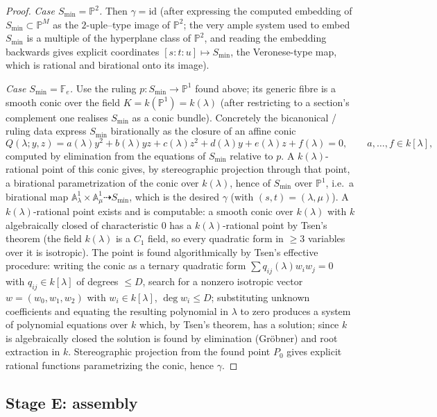 \documentclass{amsart}
\theoremstyle{plain}
\theoremstyle{definition}
\newcommand{\PP}{\mathbb{P}}
\newcommand{\AA}{\mathbb{A}}
\begin{document}
\begin{proof}
\emph{Case $S_{\min}=\PP^2$.}  Then $\gamma=\mathrm{id}$ (after expressing the
computed embedding of $S_{\min}\subset\PP^M$ as the $2$-uple--type image of
$\PP^2$; the very ample system used to embed $S_{\min}$ is a multiple of the
hyperplane class of $\PP^2$, and reading the embedding backwards gives explicit
coordinates $[s:t:u]\mapsto S_{\min}$, the Veronese-type map, which is rational
and birational onto its image).

\emph{Case $S_{\min}=\mathbb F_e$.}  Use the ruling $p\colon S_{\min}\to\PP^1$
found above; its generic fibre is a smooth conic over the field
$K=k(\PP^1)=k(\lambda)$ (after restricting to a section's complement one
realises $S_{\min}$ as a conic bundle).  Concretely the bicanonical / ruling
data express $S_{\min}$ birationally as the closure of an affine conic
\[
Q(\lambda;y,z)=a(\lambda)y^2+b(\lambda)yz+c(\lambda)z^2+d(\lambda)y+e(\lambda)z+f(\lambda)=0,
\qquad a,\dots,f\in k[\lambda],
\]
computed by elimination from the equations of $S_{\min}$ relative to $p$.  A
$k(\lambda)$-rational point of this conic gives, by stereographic projection
through that point, a birational parametrization of the conic over $k(\lambda)$,
hence of $S_{\min}$ over $\PP^1$, i.e.\ a birational map
$\AA^1_{\lambda}\times\AA^1_{\mu}\dashrightarrow S_{\min}$, which is the desired
$\gamma$ (with $(s,t)=(\lambda,\mu)$).  A $k(\lambda)$-rational point exists and
is computable: a smooth conic over $k(\lambda)$ with $k$ algebraically closed of
characteristic $0$ has a $k(\lambda)$-rational point by Tsen's theorem (the field
$k(\lambda)$ is a $C_1$ field, so every quadratic form in $\ge3$ variables over
it is isotropic).  The point is found algorithmically by Tsen's effective
procedure: writing the conic as a ternary quadratic form
$\sum q_{ij}(\lambda)w_iw_j=0$ with $q_{ij}\in k[\lambda]$ of degrees $\le D$,
search for a nonzero isotropic vector $w=(w_0,w_1,w_2)$ with $w_i\in k[\lambda]$,
$\deg w_i\le D$; substituting unknown coefficients and equating the resulting
polynomial in $\lambda$ to zero produces a system of polynomial equations over
$k$ which, by Tsen's theorem, has a solution; since $k$ is algebraically closed
the solution is found by elimination (Gr\"obner) and root extraction in $k$.
Stereographic projection from the found point $P_0$ gives explicit rational
functions parametrizing the conic, hence $\gamma$.
\end{proof}

\subsection{Stage E: assembly}
\end{document}
